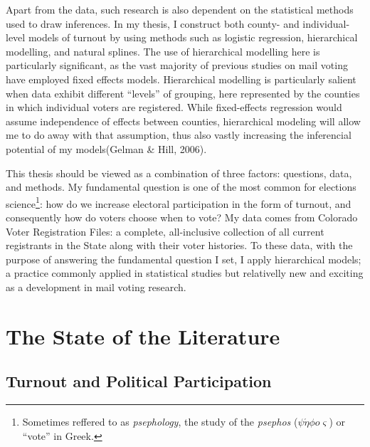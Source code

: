 \documentclass[12pt,twoside]{reedthesis}
\begin{document}
  Apart from the data, such research is also dependent on the statistical
  methods used to draw inferences. In my thesis, I construct both county-
  and individual-level models of turnout by using methods such as logistic
  regression, hierarchical modelling, and natural splines. The use of
  hierarchical modelling here is particularly significant, as the vast
  majority of previous studies on mail voting have employed fixed effects
  models. Hierarchical modelling is particularly salient when data exhibit
  different ``levels'' of grouping, here represented by the counties in
  which individual voters are registered. While fixed-effects regression
  would assume independence of effects between counties, hierarchical
  modeling will allow me to do away with that assumption, thus also vastly
  increasing the inferencial potential of my models(Gelman \& Hill, 2006).
  
  This thesis should be viewed as a combination of three factors:
  questions, data, and methods. My fundamental question is one of the most
  common for elections science\footnote{Sometimes reffered to as
    \emph{psephology}, the study of the \emph{psephos}
    (\(\psi \acute \eta \phi o \varsigma\)) or ``vote'' in Greek.}: how do
  we increase electoral participation in the form of turnout, and
  consequently how do voters choose when to vote? My data comes from
  Colorado Voter Registration Files: a complete, all-inclusive collection
  of all current registrants in the State along with their voter
  histories. To these data, with the purpose of answering the fundamental
  question I set, I apply hierarchical models; a practice commonly applied
  in statistical studies but relativelly new and exciting as a development
  in mail voting research.
  
  \chapter{The State of the Literature}\label{rmd-basics}
  
  \section{Turnout and Political
  Participation}\label{turnout-and-political-participation}
  
\end{document}
